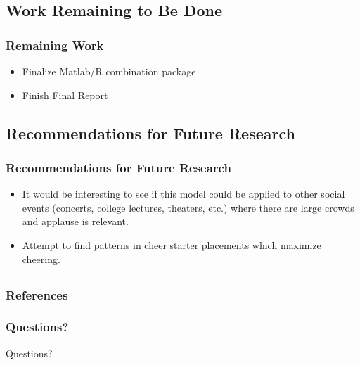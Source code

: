 \documentclass[compress,handout,10pt]{beamer}
\let\olditem\item
\renewcommand{\item}{\setlength{\itemsep}{0.5\baselineskip}\olditem}
\begin{document}
\subsection{Work Remaining to Be Done}

\begin{frame}
	\frametitle{Remaining Work}
	\begin {itemize}
		\item Finalize Matlab/R combination package
		\item Finish Final Report 
		\end {itemize}
\end{frame}

\subsection{Recommendations for Future Research}

\begin{frame}
	\frametitle {Recommendations for Future Research}
	\begin {itemize}
		\item It would be interesting to see if this model could be applied to other social events (concerts, college lectures, theaters, etc.) where there are large crowds and applause is relevant.
		\item Attempt to find patterns in cheer starter placements which maximize cheering.
	\end {itemize}
\end{frame}

\subsection{}

\begin {frame} [allowframebreaks]
	\frametitle{References}
	
	
\end {frame}

\begin{frame}
	\frametitle {Questions?}
	\begin{center}
		Questions?
	\end{center}
\end{frame}
\end{document}
